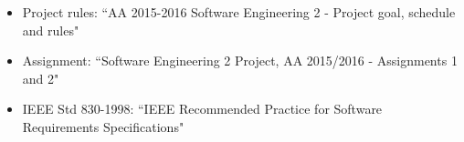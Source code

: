 \begin{itemize}
\item Project rules: ``AA 2015-2016 Software Engineering 2 - Project goal, schedule and rules"
\item Assignment: ``Software Engineering 2 Project, AA 2015/2016 - Assignments 1 and 2"
\item IEEE Std 830-1998: ``IEEE Recommended Practice for Software Requirements Specifications"
\end{itemize}